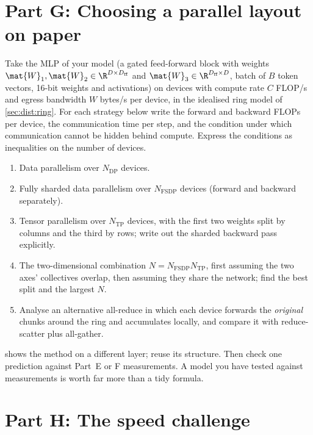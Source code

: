 \section{Part G: Choosing a parallel layout on paper}\label{sec:proj2:g}

Take the MLP of your model (a gated feed-forward block with weights $\mat{W}_1,\mat{W}_2\in\R^{D\times
D_{\text{ff}}}$ and $\mat{W}_3\in\R^{D_{\text{ff}}\times D}$, batch of $B$ token vectors, 16-bit weights
and activations) on devices with compute rate $C$ FLOP/s and egress bandwidth $W$ bytes/s per device,
in the idealised ring model of \cref{sec:dist:ring}. For each strategy below write the forward and
backward FLOPs per device, the communication time per step, and the condition under which
communication cannot be hidden behind compute. Express the conditions as inequalities on the number
of devices.
\begin{enumerate}
\item Data parallelism over $N_{\text{DP}}$ devices.
\item Fully sharded data parallelism over $N_{\text{FSDP}}$ devices (forward and backward separately).
\item Tensor parallelism over $N_{\text{TP}}$ devices, with the first two weights split by columns and
  the third by rows; write out the sharded backward pass explicitly.
\item The two-dimensional combination $N=N_{\text{FSDP}}N_{\text{TP}}$, first assuming the two axes'
  collectives overlap, then assuming they share the network; find the best split and the largest $N$.
\item Analyse an alternative all-reduce in which each device forwards the \emph{original} chunks
  around the ring and accumulates locally, and compare it with reduce-scatter plus all-gather.
\end{enumerate}
 shows the method on a different layer; reuse its structure. Then
check one prediction against Part~E or F measurements. A model you have tested against
measurements is worth far more than a tidy formula.

\section{Part H: The speed challenge}\label{sec:proj2:h}

